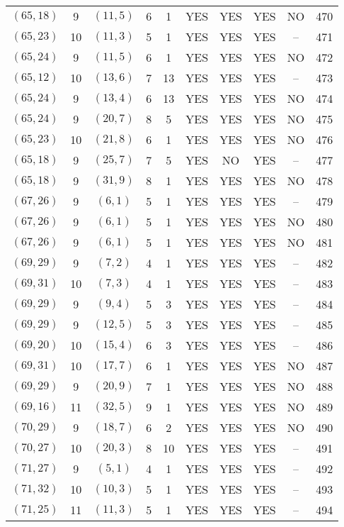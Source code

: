 \begin{longtable}{|c|c|c|c|c|c|c|c|c|c|}
$(65, 18)$ & 9 & $(11, 5)$ & 6 & 1 & YES & YES & YES & NO & 470\\
$(65, 23)$ & 10 & $(11, 3)$ & 5 & 1 & YES & YES & YES & -- & 471\\
$(65, 24)$ & 9 & $(11, 5)$ & 6 & 1 & YES & YES & YES & NO & 472\\
$(65, 12)$ & 10 & $(13, 6)$ & 7 & 13 & YES & YES & YES & -- & 473\\
$(65, 24)$ & 9 & $(13, 4)$ & 6 & 13 & YES & YES & YES & NO & 474\\
$(65, 24)$ & 9 & $(20, 7)$ & 8 & 5 & YES & YES & YES & NO & 475\\
$(65, 23)$ & 10 & $(21, 8)$ & 6 & 1 & YES & YES & YES & NO & 476\\
$(65, 18)$ & 9 & $(25, 7)$ & 7 & 5 & YES & NO & YES & -- & 477\\
$(65, 18)$ & 9 & $(31, 9)$ & 8 & 1 & YES & YES & YES & NO & 478\\
$(67, 26)$ & 9 & $(6, 1)$ & 5 & 1 & YES & YES & YES & -- & 479\\
$(67, 26)$ & 9 & $(6, 1)$ & 5 & 1 & YES & YES & YES & NO & 480\\
$(67, 26)$ & 9 & $(6, 1)$ & 5 & 1 & YES & YES & YES & NO & 481\\
$(69, 29)$ & 9 & $(7, 2)$ & 4 & 1 & YES & YES & YES & -- & 482\\
$(69, 31)$ & 10 & $(7, 3)$ & 4 & 1 & YES & YES & YES & -- & 483\\
$(69, 29)$ & 9 & $(9, 4)$ & 5 & 3 & YES & YES & YES & -- & 484\\
$(69, 29)$ & 9 & $(12, 5)$ & 5 & 3 & YES & YES & YES & -- & 485\\
$(69, 20)$ & 10 & $(15, 4)$ & 6 & 3 & YES & YES & YES & -- & 486\\
$(69, 31)$ & 10 & $(17, 7)$ & 6 & 1 & YES & YES & YES & NO & 487\\
$(69, 29)$ & 9 & $(20, 9)$ & 7 & 1 & YES & YES & YES & NO & 488\\
$(69, 16)$ & 11 & $(32, 5)$ & 9 & 1 & YES & YES & YES & NO & 489\\
$(70, 29)$ & 9 & $(18, 7)$ & 6 & 2 & YES & YES & YES & NO & 490\\
$(70, 27)$ & 10 & $(20, 3)$ & 8 & 10 & YES & YES & YES & -- & 491\\
$(71, 27)$ & 9 & $(5, 1)$ & 4 & 1 & YES & YES & YES & -- & 492\\
$(71, 32)$ & 10 & $(10, 3)$ & 5 & 1 & YES & YES & YES & -- & 493\\
$(71, 25)$ & 11 & $(11, 3)$ & 5 & 1 & YES & YES & YES & -- & 494\\

\end{longtable}
